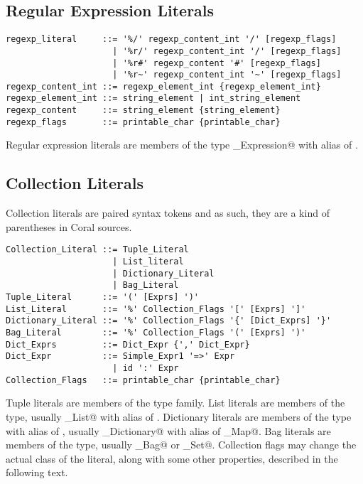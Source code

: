 \subsection{Regular Expression Literals}\label{sec:regexpliterals}

\syntax\begin{lstlisting}
regexp_literal     ::= '%/' regexp_content_int '/' [regexp_flags]
	                 | '%r/' regexp_content_int '/' [regexp_flags]
	                 | '%r#' regexp_content '#' [regexp_flags]
	                 | '%r~' regexp_content_int '~' [regexp_flags]
regexp_content_int ::= regexp_element_int {regexp_element_int}
regexp_element_int ::= string_element | int_string_element
regexp_content     ::= string_element {string_element}
regexp_flags       ::= printable_char {printable_char}
\end{lstlisting}

Regular expression literals are members of the type \lstinline@Regular_Expression@ with alias of \lstinline@Regexp@. 






\subsection{Collection Literals}\label{sec:collectionliterals}

Collection literals are paired syntax tokens and as such, they are a kind of parentheses in Coral sources. 

\syntax\begin{lstlisting}
Collection_Literal ::= Tuple_Literal
	                 | List_literal
	                 | Dictionary_Literal
	                 | Bag_Literal
Tuple_Literal      ::= '(' [Exprs] ')'
List_Literal       ::= '%' Collection_Flags '[' [Exprs] ']'
Dictionary_Literal ::= '%' Collection_Flags '{' [Dict_Exprs] '}'
Bag_Literal        ::= '%' Collection_Flags '(' [Exprs] ')'
Dict_Exprs         ::= Dict_Expr {',' Dict_Expr}
Dict_Expr          ::= Simple_Expr1 '=>' Expr
	                 | id ':' Expr
Collection_Flags   ::= printable_char {printable_char}
\end{lstlisting}

Tuple literals are members of the \lstinline@Tuple@ type family. List literals are members of the \lstinline@List@ type, usually \lstinline@Array_List@ with alias of \lstinline@Array@. Dictionary literals are members of the \lstinline@Dictionary@ type with alias of \lstinline@Map@, usually \lstinline@Hash_Dictionary@ with alias of \lstinline@Hash_Map@. Bag literals are members of the \lstinline@Bag@ type, usually \lstinline@Hash_Bag@ or \lstinline@Hash_Set@. Collection flags may change the actual class of the literal, along with some other properties, described in the following text. 

